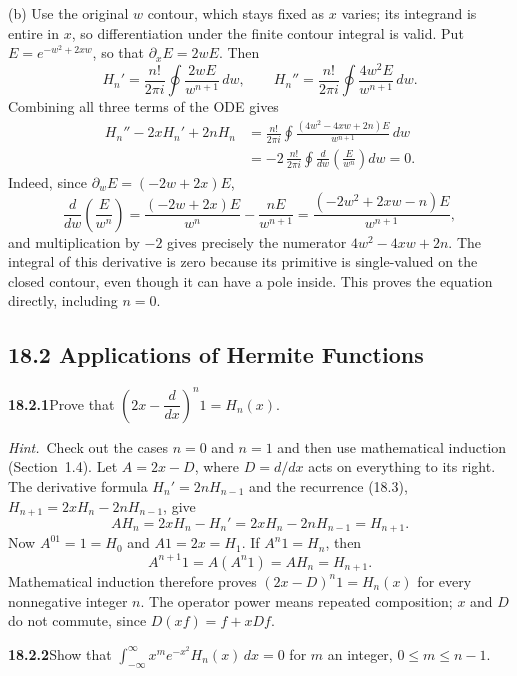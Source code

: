 (b) Use the original $w$ contour, which stays fixed as $x$ varies;
its integrand is entire in $x$, so differentiation under the finite
contour integral is valid.  Put $E=e^{-w^2+2xw}$, so that
$\partial_xE=2wE$.  Then
\[
H_n'=\frac{n!}{2\pi i}\oint\frac{2wE}{w^{n+1}}\,dw,
\qquad
H_n''=\frac{n!}{2\pi i}\oint\frac{4w^2E}{w^{n+1}}\,dw.
\]
Combining all three terms of the ODE gives
\begin{align*}
H_n''-2xH_n'+2nH_n
 &=\frac{n!}{2\pi i}\oint
 \frac{(4w^2-4xw+2n)E}{w^{n+1}}\,dw\\
 &=-2\,\frac{n!}{2\pi i}\oint
 \frac{d}{dw}\left(\frac{E}{w^n}\right)dw=0.
\end{align*}
Indeed, since $\partial_wE=(-2w+2x)E$,
\[
\frac{d}{dw}\left(\frac{E}{w^n}\right)
 =\frac{(-2w+2x)E}{w^n}-\frac{nE}{w^{n+1}}
 =\frac{(-2w^2+2xw-n)E}{w^{n+1}},
\]
and multiplication by $-2$ gives precisely the numerator
$4w^2-4xw+2n$.  The integral of this derivative is zero
because its primitive is single-valued on the closed contour, even
though it can have a pole inside.  This proves the equation directly,
including $n=0$.

\subsection*{18.2 Applications of Hermite Functions}

\par\bigskip
\noindent\textbf{18.2.1}\quad Prove that
$\left(2x-\dfrac{d}{dx}\right)^{n}1=H_{n}(x)$.
\par\emph{Hint.}~Check out the cases $n=0$ and $n=1$ and then use
mathematical induction (Section~1.4).
\solution
Let $A=2x-D$, where $D=d/dx$ acts on everything to its right.
The derivative formula $H_n'=2nH_{n-1}$ and the recurrence (18.3),
$H_{n+1}=2xH_n-2nH_{n-1}$, give
\[
AH_n=2xH_n-H_n'=2xH_n-2nH_{n-1}=H_{n+1}.
\]
Now $A^01=1=H_0$ and $A1=2x=H_1$.  If $A^n1=H_n$, then
\[
A^{n+1}1=A(A^n1)=AH_n=H_{n+1}.
\]
Mathematical induction therefore proves
$\boxed{(2x-D)^n1=H_n(x)}$ for every nonnegative integer $n$.
The operator power means repeated composition; $x$ and $D$ do not
commute, since $D(xf)=f+xDf$.

\par\bigskip
\noindent\textbf{18.2.2}\quad Show that
$\displaystyle\int_{-\infty}^{\infty}x^{m}e^{-x^{2}}H_{n}(x)\,dx=0$
for $m$ an integer, $0\le m\le n-1$.
\solution
{}\par

